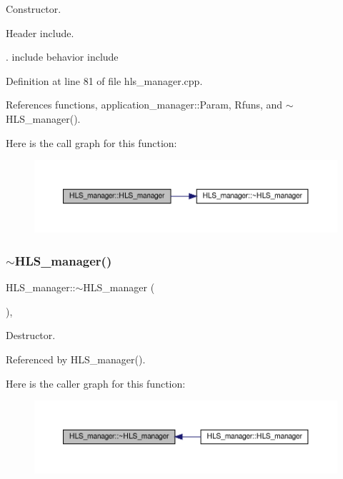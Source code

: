 Constructor. 

Header include.

. include behavior include 

Definition at line 81 of file hls\+\_\+manager.\+cpp.



References functions, application\+\_\+manager\+::\+Param, Rfuns, and $\sim$\+H\+L\+S\+\_\+manager().

Here is the call graph for this function\+:
\nopagebreak
\begin{figure}[H]
\begin{center}
\leavevmode
\includegraphics[width=350pt]{dc/dd7/classHLS__manager_aa1e62cc57b722b661605ea798812ab79_cgraph}
\end{center}
\end{figure}
\mbox{\label{classHLS__manager_a2ec17f0c6f719db1769935ef838105d1}} 
\subsubsection{\texorpdfstring{$\sim$\+H\+L\+S\+\_\+manager()}{~HLS\_manager()}}
{\footnotesize\ttfamily H\+L\+S\+\_\+manager\+::$\sim$\+H\+L\+S\+\_\+manager (\begin{DoxyParamCaption}{ }\end{DoxyParamCaption})\hspace{0.3cm}{\ttfamily [override]}, {\ttfamily [default]}}



Destructor. 



Referenced by H\+L\+S\+\_\+manager().

Here is the caller graph for this function\+:
\nopagebreak
\begin{figure}[H]
\begin{center}
\leavevmode
\includegraphics[width=350pt]{dc/dd7/classHLS__manager_a2ec17f0c6f719db1769935ef838105d1_icgraph}
\end{center}
\end{figure}


